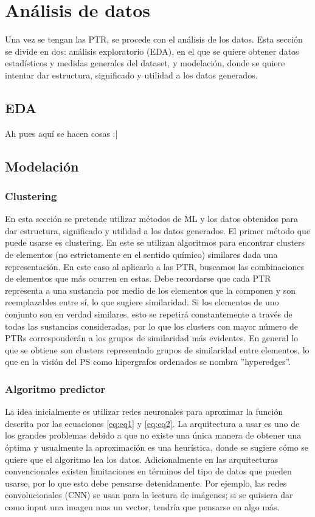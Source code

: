 \documentclass[twoside,twocolumn]{article}
\begin{document}
\section{An\'alisis de datos}

Una vez se tengan las PTR, se procede con el an\'alisis de los datos. Esta secci\'on se divide en dos: an\'alisis exploratorio (EDA), en el que se quiere obtener datos estad\'isticos y medidas generales del dataset, y modelaci\'on, donde se quiere intentar dar estructura, significado y utilidad a los datos generados. 

\subsection{EDA}

Ah pues aqu\'i se hacen cosas :|

\subsection{Modelaci\'on}
\subsubsection{Clustering}
En esta secci\'on se pretende utilizar m\'etodos de ML y los datos obtenidos para dar estructura, significado y utilidad a los datos generados.
El primer m\'etodo que puede usarse es clustering. En este se utilizan algoritmos para encontrar clusters de elementos (no estrictamente en el sentido qu\'imico) similares dada una representaci\'on. En este caso al aplicarlo a las PTR, buscamos las combinaciones de elementos que m\'as ocurren en estas. Debe recordarse que cada PTR representa a una sustancia por medio de los elementos que la componen y son reemplazables entre s\'i, lo que sugiere similaridad. Si los elementos de uno conjunto son en verdad similares, esto se repetir\'a constantemente a trav\'es de todas las sustancias consideradas, por lo que los clusters con mayor n\'umero de PTRs corresponder\'an a los grupos de similaridad m\'as evidentes. En general lo que se obtiene son clusters representado grupos de similaridad entre elementos, lo que en la visi\'on del PS como hipergrafos ordenados se nombra ''hyperedges''.

\subsubsection{Algoritmo predictor}
La idea inicialmente es utilizar redes neuronales para aproximar la funci\'on descrita por las ecuaciones \ref{eq:eq1} y \ref{eq:eq2}. La arquitectura a usar es uno de los grandes problemas debido a que no existe una \'unica manera de obtener una \'optima y usualmente la aproximaci\'on es una heur\'istica, donde se sugiere c\'omo se quiere que el algoritmo lea los datos. Adicionalmente en las arquitecturas convencionales existen limitaciones en t\'erminos del tipo de datos que pueden usarse, por lo que esto debe pensarse detenidamente. Por ejemplo, las redes convolucionales (CNN) se usan para la lectura de im\'agenes; si se quisiera dar como input una imagen mas un vector, tendr\'ia que pensarse en algo m\'as.
\end{document}
